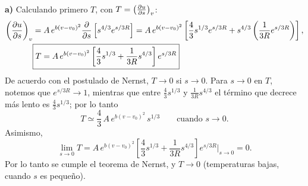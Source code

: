 \begin{solucion}
  \textbf{a)} Calculando primero $T$, con $T=\left(\frac{\partial u}{\partial s}\right)_{v}$:
  \begin{align*}
    \left(\frac{\partial u}{\partial s}\right)_{v}&=A\,e^{b(v-v_0)^{2}}\pdv{s}\left[s^{4/3}e^{s/3R}\right]
      =A\,e^{b(v-v_0)^{2}}\left[\frac{4}{3}s^{1/3}e^{s/3R}+s^{4/3}\left(\frac{1}{3R}e^{s/3R}\right)\right],\\
    &\boxed{T=A\,e^{b(v-v_0)^{2}}\left[\frac{4}{3}s^{1/3}+\frac{1}{3R}s^{4/3}\right]e^{s/3R}}
  \end{align*}
  De acuerdo con el postulado de Nernst, $T\to0$ si $s\to0$. Para $s\to0$ en $T$, notemos que
  $e^{s/3R}\to1$, mientras que entre $\frac{4}{3}s^{1/3}$ y $\frac{1}{3R}s^{4/3}$ el término que
  decrece más lento es $\frac{4}{3}s^{1/3}$; por lo tanto
  \begin{equation*}
    T\simeq\frac{4}{3}\,A\,e^{b(v-v_0)^{2}}\,s^{1/3}\qquad\text{cuando }s\to0.
  \end{equation*}
  Asimismo,
  \begin{equation*}
    \lim_{s\to0}T=A\,e^{b(v-v_0)^{2}}\left[\frac{4}{3}s^{1/3}+\frac{1}{3R}s^{4/3}\right]e^{s/3R}\Bigg|_{s\to0}=0.
  \end{equation*}
  Por lo tanto se cumple el teorema de Nernst, y $T\to0$ (temperaturas bajas, cuando $s$ es pequeño).


\end{solucion}
